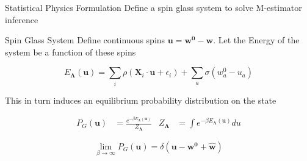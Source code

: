 \documentclass[pdf]{beamer}
\begin{document}
\begin{frame}[t]{Statistical Physics Formulation}
Define a spin glass system to solve M-estimator inference

\begin{block}{Spin Glass System}
Define continuous spins $\mathbf{u}=\mathbf{w^0}-\mathbf{w}$. Let the Energy of the system be a function of these spins

\begin{equation*}
 E_{\boldsymbol{\Lambda}}(\mathbf{u})=\sum_i{\rho\left(\mathbf{X}_{i}\cdot \mathbf{u} +\epsilon_i\right)}+\sum_a{\sigma(w^0_a-u_a)}
\end{equation*}



This in turn induces an equilibrium probability distribution on the state

\begin{align*}
P_{G}(\mathbf{u}) &= \frac{e^{-\beta E_{\boldsymbol{\Lambda}}(\mathbf{u})}}{Z_{\boldsymbol{\Lambda}}} & Z_{\boldsymbol{\Lambda}} &= \int{e^{-\beta E_{\boldsymbol{\Lambda}} (\mathbf{u}) }du}
\end{align*}



\begin{equation*}
\lim_{\beta \rightarrow \infty} P_{G}(\mathbf{u}) = \delta\left(\mathbf{u} - \mathbf{w^0} +\mathbf{\hat{w}}\right)
\end{equation*}

\end{block}


\end{frame}
\end{document}
